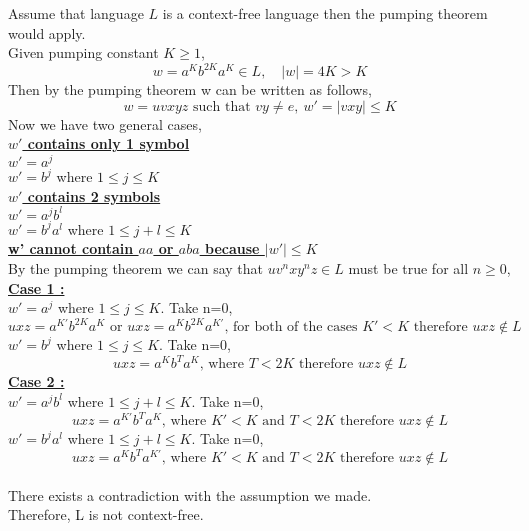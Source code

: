 \documentclass[a4paper,12pt]{article}
\begin{document}
\begin{tcolorbox}
Assume that language $L$ is a context-free language then the pumping theorem would apply. \\
Given pumping constant $K\geq1$,
$$w=a^Kb^{2K}a^K\in L,\quad |w|=4K>K$$
Then by the pumping theorem w can be written as follows,
$$w=uvxyz \text{ such that } vy\neq e,\ w'=|vxy|\leq K$$
Now we have two general cases, \\
\textbf{\underline{$w'$ contains only 1 symbol}} \\
$w'=a^j$ \\
$w'=b^j$ where $1\leq j\leq K$ \\
\textbf{\underline{$w'$ contains 2 symbols}} \\
$w'=a^jb^l$ \\
$w'=b^ja^l$ where $1\leq j+l \leq K$ \\
\textbf{\underline{w' cannot contain $aa$ or $aba$ because $|w'|\leq K$}} \\ 
By the pumping theorem we can say that $uv^nxy^nz\in L$ must be true for all $n\geq 0$, \\
\textbf{\underline{Case 1 :}} \\
$w'=a^j$ where $1\leq j\leq K$. Take n=0, 
$$uxz=a^{K'}b^{2K}a^K \text{ or } uxz=a^{K}b^{2K}a^{K'} \text{, for both of the cases } K'<K \text{ therefore } uxz\notin L$$
$w'=b^j$ where $1\leq j\leq K$. Take n=0, 
$$uxz=a^{K}b^{T}a^K  \text{, where } T<2K \text{ therefore } uxz\notin L$$
\textbf{\underline{Case 2 :}} \\
$w'=a^jb^l$ where $1\leq j+l\leq K$. Take n=0, 
$$uxz=a^{K'}b^{T}a^K \text{, where } K'<K \text{ and } T<2K \text{ therefore } uxz\notin L$$
$w'=b^ja^l$ where $1\leq j+l\leq K$. Take n=0, 
$$uxz=a^{K}b^{T}a^{K'}\text{, where } K'<K \text{ and } T<2K \text{ therefore } uxz\notin L$$\\
There exists a contradiction with the assumption we made. \\
Therefore, L is not context-free.
\end{tcolorbox}
\end{document}
